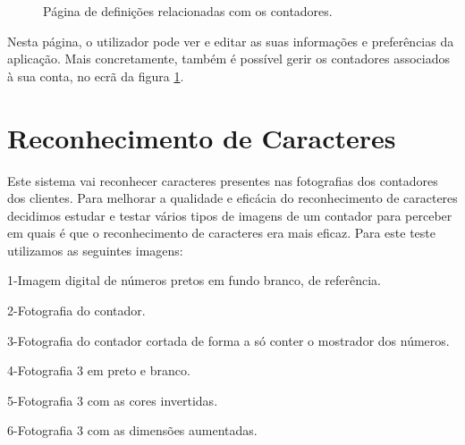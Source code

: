 \begin{figure}
\begin{minipage}{.5\textwidth}
\caption{Página de definições relacionadas com os contadores.}
\label{fig:5}
\end{minipage}
\end{figure}

Nesta página, o utilizador pode ver e editar as suas informações e preferências da aplicação. Mais concretamente, também é possível gerir os contadores associados à sua conta, no ecrã da figura \ref{fig:5}.

\section{Reconhecimento de Caracteres} \label{caracteres}
Este sistema vai reconhecer caracteres presentes nas fotografias dos contadores dos clientes. Para melhorar a qualidade e eficácia do reconhecimento de caracteres decidimos estudar e testar vários tipos de imagens de um contador para perceber em quais é que o reconhecimento de caracteres era mais eficaz.
Para este teste utilizamos as seguintes imagens:\\
\par1-Imagem digital de números pretos em fundo branco, de referência.
\par2-Fotografia do contador.
\par3-Fotografia do contador cortada de forma a só conter o mostrador dos números.
\par4-Fotografia 3 em preto e branco.
\par5-Fotografia 3 com as cores invertidas.
\par6-Fotografia 3 com as dimensões aumentadas.\\

